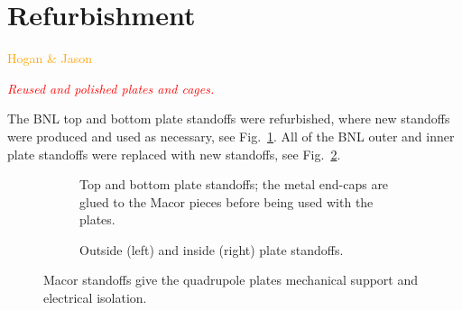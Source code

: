 \section{\label{sec:refurb} Refurbishment}
\textcolor{orange}{Hogan \& Jason}
\medskip

\textcolor{red}{\textit{Reused and polished plates and cages.}}
\medskip

The BNL top and bottom plate standoffs were refurbished, where new standoffs were produced and used as necessary, see Fig.~\ref{fig:tbstandoffs}. All of the BNL outer and inner plate standoffs were replaced with new standoffs, see Fig.~\ref{fig:oistandoffs}.
\begin{figure}[]
	\centering
	\begin{subfigure}{\columnwidth}
		\caption{Top and bottom plate standoffs; the metal end-caps are glued to the Macor pieces before being used with the plates.}\label{fig:tbstandoffs}
	\end{subfigure}
	\begin{subfigure}{\columnwidth}
		\caption{Outside (left) and inside (right) plate standoffs.}\label{fig:oistandoffs}
	\end{subfigure}
	\caption{Macor standoffs give the quadrupole plates mechanical support and electrical isolation.}\label{fig:standoffs}
\end{figure}

